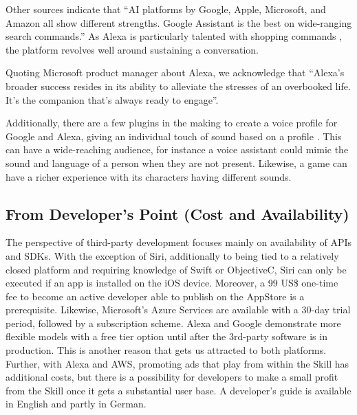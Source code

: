 Other sources indicate that ``AI platforms by Google, Apple, Microsoft, and Amazon all show different strengths. Google Assistant is the best on wide-ranging search commands.'' \cite{mit:Alexa} %
As Alexa is particularly talented with shopping commands \cite{mit:Alexa}, the platform revolves well around sustaining a conversation. %

Quoting Microsoft product manager about Alexa, we acknowledge that ``Alexa’s broader success resides in its ability to alleviate the stresses of an overbooked life. It’s the companion that’s always ready to engage''\cite{darrenAustin}.

Additionally, there are a few plugins in the making to create a voice profile for Google and Alexa, giving an individual touch of sound based on a profile \cite{alexa_19}. This can have a wide-reaching  audience, for instance a voice assistant could mimic the sound and language of a person when they are not present. Likewise, a game can have a richer experience with its characters having different sounds.

%
%	
%	
%	

\subsection*{From Developer's Point (Cost and Availability)}

The perspective of third-party development focuses mainly on availability of APIs and SDKs. With the exception of Siri, additionally to being tied to a relatively closed platform and requiring knowledge of Swift or ObjectiveC, Siri can only be executed if an app is installed on the iOS device.
Moreover, a 99 US\$ one-time fee to become an active developer able to publish on the AppStore is a prerequisite.
Likewise, Microsoft's Azure Services are available with a 30-day trial period, followed by a subscription scheme.
Alexa and Google demonstrate more flexible models with a free tier option %
until after the 3rd-party software is in production. This is another reason that gets us attracted to both platforms. Further, with Alexa and AWS, promoting ads that play from within the Skill has additional costs, but there is a possibility for developers to make a small profit from the Skill once it gets a substantial user base. A developer's guide is available in English and partly in German.

